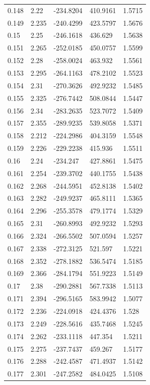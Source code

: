 \begin{tabular}{lllll}
0.148 & 2.22 & -234.8204 & 410.9161 & 1.5715 \\
0.149 & 2.235 & -240.4299 & 423.5797 & 1.5676 \\
0.15 & 2.25 & -246.1618 & 436.629 & 1.5638 \\
0.151 & 2.265 & -252.0185 & 450.0757 & 1.5599 \\
0.152 & 2.28 & -258.0024 & 463.932 & 1.5561 \\
0.153 & 2.295 & -264.1163 & 478.2102 & 1.5523 \\
0.154 & 2.31 & -270.3626 & 492.9232 & 1.5485 \\
0.155 & 2.325 & -276.7442 & 508.0844 & 1.5447 \\
0.156 & 2.34 & -283.2635 & 523.7072 & 1.5409 \\
0.157 & 2.355 & -289.9235 & 539.8058 & 1.5371 \\
0.158 & 2.212 & -224.2986 & 404.3159 & 1.5548 \\
0.159 & 2.226 & -229.2238 & 415.936 & 1.5511 \\
0.16 & 2.24 & -234.247 & 427.8861 & 1.5475 \\
0.161 & 2.254 & -239.3702 & 440.1755 & 1.5438 \\
0.162 & 2.268 & -244.5951 & 452.8138 & 1.5402 \\
0.163 & 2.282 & -249.9237 & 465.8111 & 1.5365 \\
0.164 & 2.296 & -255.3578 & 479.1774 & 1.5329 \\
0.165 & 2.31 & -260.8993 & 492.9232 & 1.5293 \\
0.166 & 2.324 & -266.5502 & 507.0594 & 1.5257 \\
0.167 & 2.338 & -272.3125 & 521.597 & 1.5221 \\
0.168 & 2.352 & -278.1882 & 536.5474 & 1.5185 \\
0.169 & 2.366 & -284.1794 & 551.9223 & 1.5149 \\
0.17 & 2.38 & -290.2881 & 567.7338 & 1.5113 \\
0.171 & 2.394 & -296.5165 & 583.9942 & 1.5077 \\
0.172 & 2.236 & -224.0918 & 424.4376 & 1.528 \\
0.173 & 2.249 & -228.5616 & 435.7468 & 1.5245 \\
0.174 & 2.262 & -233.1118 & 447.354 & 1.5211 \\
0.175 & 2.275 & -237.7437 & 459.267 & 1.5177 \\
0.176 & 2.288 & -242.4587 & 471.4937 & 1.5142 \\
0.177 & 2.301 & -247.2582 & 484.0425 & 1.5108 \\

\end{tabular}
